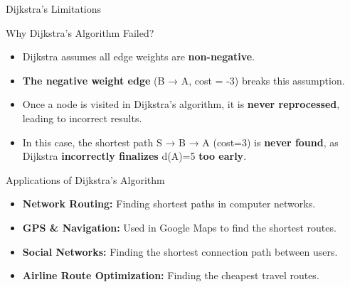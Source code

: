 \documentclass{beamer}
\begin{document}
\begin{frame}{Dijkstra’s Limitations}
\begin{center}
    \end{center}
\end{frame}

\begin{frame}{Why Dijkstra’s Algorithm Failed?}
  
        \begin{itemize}
            \item Dijkstra assumes all edge weights are \textbf{non-negative}.
            \item \textbf{The negative weight edge} (B → A, cost = -3) breaks this assumption.
            \item Once a node is visited in Dijkstra’s algorithm, it is \textbf{never reprocessed}, leading to incorrect results.
            \item In this case, the shortest path S → B → A (cost=3) is \textbf{never found}, as Dijkstra \textbf{incorrectly finalizes} d(A)=5 \textbf{too early}.
        \end{itemize}
   
\end{frame}



\begin{frame}{Applications of Dijkstra’s Algorithm}
   
        \begin{itemize}
            \item \textbf{Network Routing:} Finding shortest paths in computer networks.
            \item \textbf{GPS \& Navigation:} Used in Google Maps to find the shortest routes.
            \item \textbf{Social Networks:} Finding the shortest connection path between users.
            \item \textbf{Airline Route Optimization:} Finding the cheapest travel routes.
        \end{itemize}
    
\end{frame}
\end{document}
